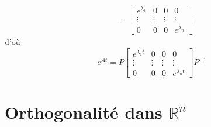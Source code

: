 \documentclass[11pt,colorlinks]{book}
\theoremstyle{mytheoremstyle}
\theoremstyle{mytheoremstyle}
\theoremstyle{mytheoremstyle}
\theoremstyle{mytheoremstyle}
\theoremstyle{mytheoremstyle}
\theoremstyle{mytheoremstyle}
\theoremstyle{mytheoremstyle}
\theoremstyle{mytheoremstyle}
\theoremstyle{myproblemstyle}
\def\mbb#1{\mathbb{#1}}
\def\bR{\mbb{R}}
\begin{document}
\begin{definition}
\begin{align*}
    &= \begin{bmatrix}
      e^{\lambda_1} & 0 & 0 & 0 \\ 
      \vdots & \vdots & \vdots & \vdots \\ 
      0 & 0 & 0 & e^{\lambda_n}
    \end{bmatrix}
  \end{align*}
  d'où
  \begin{equation*}
    e^{At} = P\begin{bmatrix}
      e^{\lambda_1 t} & 0 & 0 & 0 \\ 
      \vdots & \vdots & \vdots & \vdots \\ 
      0 & 0 & 0 & e^{\lambda_n t}
    \end{bmatrix}P^{-1}
  \end{equation*}
\end{definition}


\chapter{Orthogonalité dans $\bR^n$}
\end{document}
